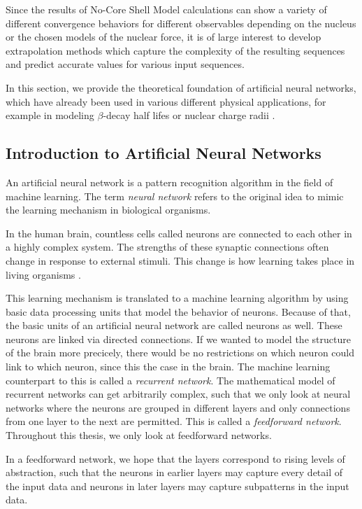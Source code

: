 
Since the results of No-Core Shell Model calculations can show a variety of different convergence behaviors for different observables depending on the nucleus or the chosen models of the nuclear force, it is of large interest to develop extrapolation methods which capture the complexity of the resulting sequences and predict accurate values for various input sequences.

In this section, we provide the theoretical foundation of artificial neural networks, which have already been used in various different physical
applications, for example in modeling $\beta$-decay half lifes \cite{nnbetadecay} or nuclear charge radii \cite{Akkoyun_2013}.

\subsection{Introduction to Artificial Neural Networks}

An artificial neural network is a pattern recognition algorithm in the field of machine learning. The term \textit{neural network} refers to the original idea to mimic the learning mechanism in biological organisms.

In the human brain, countless cells called neurons are connected to each other in a highly complex system. The strengths of these synaptic connections often change in response to external stimuli. This change is how learning takes place in living organisms \cite{Aggarwal2018}.

This learning mechanism is translated to a machine learning algorithm by using basic data processing units that model the behavior of neurons. Because of that, the basic units of an artificial neural network are called neurons as well. These neurons are linked via directed connections. If we wanted to model the structure of the brain more precicely, there would be no restrictions on which neuron could link to which neuron, since this the case in the brain. The machine learning counterpart to this is called a \textit{recurrent network}. The mathematical model of recurrent networks can get arbitrarily complex, such that we only look at neural networks where the neurons are grouped in different layers and only connections from one layer to the next are permitted. This is called a \textit{feedforward network}. Throughout this thesis, we only look at feedforward networks.

In a feedforward network, we hope that the layers correspond to rising levels of abstraction, such that the neurons in earlier layers may capture every detail of the input data and neurons in later layers may capture subpatterns in the input data.

